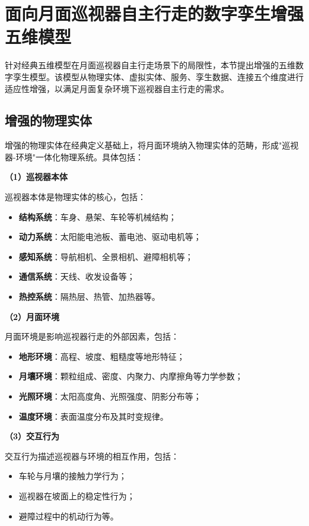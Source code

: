 \section{面向月面巡视器自主行走的数字孪生增强五维模型}
\label{sec:enhanced_model}

针对经典五维模型在月面巡视器自主行走场景下的局限性，本节提出增强的五维数字孪生模型。该模型从物理实体、虚拟实体、服务、孪生数据、连接五个维度进行适应性增强，以满足月面复杂环境下巡视器自主行走的需求。

\subsection{增强的物理实体}
\label{subsec:enhanced_pe}

增强的物理实体在经典定义基础上，将月面环境纳入物理实体的范畴，形成"巡视器-环境"一体化物理系统。具体包括：

\textbf{（1）巡视器本体}

巡视器本体是物理实体的核心，包括：
\begin{itemize}
    \item \textbf{结构系统}：车身、悬架、车轮等机械结构；
    \item \textbf{动力系统}：太阳能电池板、蓄电池、驱动电机等；
    \item \textbf{感知系统}：导航相机、全景相机、避障相机等；
    \item \textbf{通信系统}：天线、收发设备等；
    \item \textbf{热控系统}：隔热层、热管、加热器等。
\end{itemize}

\textbf{（2）月面环境}

月面环境是影响巡视器行走的外部因素，包括：
\begin{itemize}
    \item \textbf{地形环境}：高程、坡度、粗糙度等地形特征；
    \item \textbf{月壤环境}：颗粒组成、密度、内聚力、内摩擦角等力学参数；
    \item \textbf{光照环境}：太阳高度角、光照强度、阴影分布等；
    \item \textbf{温度环境}：表面温度分布及其时变规律。
\end{itemize}

\textbf{（3）交互行为}

交互行为描述巡视器与环境的相互作用，包括：
\begin{itemize}
    \item 车轮与月壤的接触力学行为；
    \item 巡视器在坡面上的稳定性行为；
    \item 避障过程中的机动行为等。
\end{itemize}

